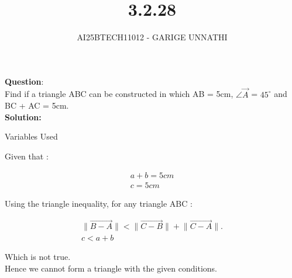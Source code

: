 \documentclass[journal]{IEEEtran}
\begin{document}

\vspace{3cm}

\title{3.2.28}
\author{AI25BTECH11012 - GARIGE UNNATHI}
{\let\newpage\relax\maketitle}


\renewcommand{\thefigure}{\theenumi}
\renewcommand{\thetable}{\theenumi}
\setlength{\intextsep}{10pt} %


\renewcommand{\thetable}{\theenumi}


\textbf{Question}:\\
Find if a triangle ABC can be constructed in which AB = 5cm, $\angle \vec{A}$ = $45^\circ$ and BC + AC = 5cm.\\
\textbf{Solution: }

 \begin{table}[h!]    
      \centering
      
      \caption{Variables Used}
      \label{}
    \end{table}

Given that : 

\begin{align*}
  a + b = 5 cm\\
  c = 5cm
\end{align*}

Using the triangle inequality, for any triangle ABC :



\begin{align}
    \lVert \vec{B - A}\rVert < \lVert \vec{C - B}\rVert + \lVert \vec{C - A}\rVert.\\
    c < a+b
 \end{align}


Which is not true.\\

Hence we cannot form a triangle with the given conditions.
\end{document}
